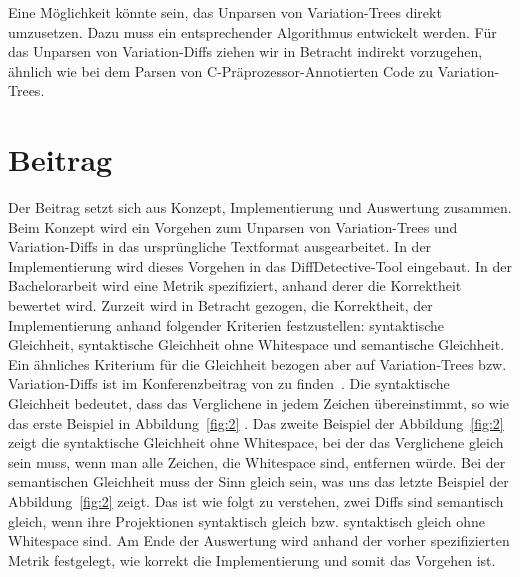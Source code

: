 \documentclass[11pt,a4paper,oneside]{article}
\begin{document}
	Eine Möglichkeit könnte sein, das Unparsen von Variation-Trees direkt umzusetzen. Dazu muss ein entsprechender Algorithmus entwickelt werden. Für das Unparsen von Variation-Diffs ziehen wir in Betracht indirekt vorzugehen, ähnlich wie bei dem Parsen von C-Präprozessor-Annotierten Code zu Variation-Trees. 
	 
	\section{Beitrag}
	Der Beitrag setzt sich aus Konzept, Implementierung und Auswertung zusammen. Beim Konzept wird ein Vorgehen zum Unparsen von Variation-Trees und Variation-Diffs in das ursprüngliche Textformat ausgearbeitet. In der Implementierung wird dieses Vorgehen in das DiffDetective-Tool eingebaut. In der Bachelorarbeit wird eine Metrik spezifiziert, anhand derer die Korrektheit bewertet wird. Zurzeit wird in Betracht gezogen, die Korrektheit, der Implementierung anhand folgender Kriterien festzustellen: syntaktische Gleichheit, syntaktische Gleichheit ohne Whitespace und semantische Gleichheit. Ein ähnliches Kriterium für die Gleichheit bezogen aber auf Variation-Trees bzw. Variation-Diffs ist im Konferenzbeitrag von \citeauthor{BSG+:SPLC23} zu finden~\cite{BSG+:SPLC23}.  Die syntaktische Gleichheit bedeutet, dass das Verglichene in jedem Zeichen übereinstimmt, so wie das erste Beispiel in Abbildung~\ref{fig:2} . Das zweite Beispiel der Abbildung~\ref{fig:2} zeigt die syntaktische Gleichheit ohne Whitespace, bei der das Verglichene gleich sein muss, wenn man alle Zeichen, die Whitespace sind, entfernen würde. Bei der semantischen Gleichheit muss der Sinn gleich sein, was uns das letzte Beispiel der Abbildung~\ref{fig:2}    zeigt. Das ist wie folgt zu verstehen, zwei Diffs sind semantisch gleich, wenn ihre Projektionen syntaktisch gleich bzw. syntaktisch gleich ohne Whitespace sind. Am Ende der Auswertung wird anhand der vorher spezifizierten Metrik festgelegt, wie korrekt die Implementierung und somit das Vorgehen ist.\\
	
	
	
\end{document}
